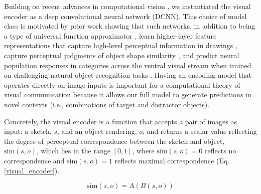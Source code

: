 \documentclass[9pt,twocolumn,twoside]{pnas-new}
\begin{document}
Building on recent advances in computational vision \cite{FanCommon2018,yamins2014performance}, we instantiated the visual encoder as a deep convolutional neural network (DCNN). 
This choice of model class is motivated by prior work showing that such networks, in addition to being a type of universal function approximator \cite{hornik1991approximation}, learn higher-layer feature representations that capture high-level perceptual information in drawings \cite{FanCommon2018}, capture perceptual judgments of object shape similarity \cite{kubilius2016deep}, and predict neural population responses in categories across the ventral visual stream \cite{yamins2014performance} when trained on challenging natural object recognition tasks \cite{deng2009imagenet}. 
Having an encoding model that operates directly on image inputs is important for a computational theory of visual communication because it allows our full model to generate predictions in novel contexts (i.e., combinations of target and distractor objects).

Concretely, the visual encoder is a function that accepts a pair of images as input: a sketch, $s$, and an object rendering, $o$, and returns a scalar value reflecting the degree of perceptual correspondence between the sketch and object, $\textrm{sim}(s,o)$, which lies in the range $[0,1]$, where $\textrm{sim}(s,o)=0$ reflects no correspondence and $\textrm{sim}(s,o)=1$ reflects maximal correspondence (Eq. \ref{visual_encoder}).

\begin{equation}
\label{visual_encoder}
\textrm{sim}(s,o) = A(B(s,o))
\end{equation}
\end{document}
